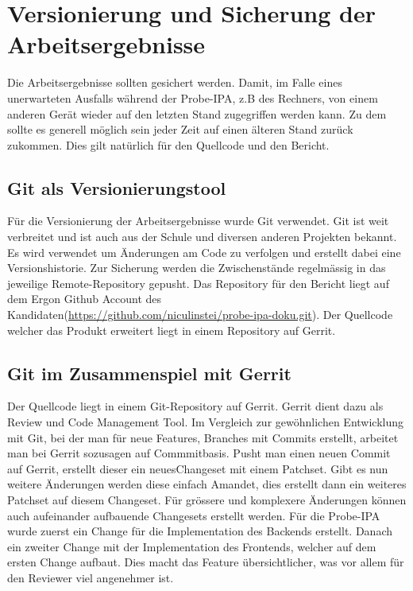 \chapter{Versionierung und Sicherung der Arbeitsergebnisse}\label{ch:versionierung-und-sicherung-der-arbeitsergebnisse}

Die Arbeitsergebnisse sollten gesichert werden. Damit, im Falle eines unerwarteten Ausfalls während der Probe-IPA, z.B des Rechners, von einem anderen Gerät wieder auf den letzten Stand zugegriffen werden kann. Zu dem sollte es generell möglich sein jeder Zeit auf einen älteren Stand zurück zukommen. Dies gilt natürlich für den Quellcode und den Bericht.

\section{Git als Versionierungstool}
Für die Versionierung der Arbeitsergebnisse wurde Git verwendet. 
Git ist weit verbreitet und ist auch aus der Schule und diversen anderen Projekten bekannt. Es wird verwendet um Änderungen am Code zu verfolgen und erstellt dabei eine Versionshistorie. \newline Zur Sicherung werden die Zwischenstände regelmässig in das jeweilige Remote-Repository gepusht.
Das Repository für den Bericht liegt auf dem Ergon Github Account des Kandidaten(\url{https://github.com/niculinstei/probe-ipa-doku.git}).
Der Quellcode welcher das Produkt erweitert liegt in einem Repository auf Gerrit.



\section{Git im Zusammenspiel mit Gerrit}
Der Quellcode liegt in einem Git-Repository auf Gerrit. Gerrit dient dazu als Review und Code Management Tool. 
Im Vergleich zur \flqq gewöhnlichen\frqq{}  Entwicklung mit Git, bei der man für neue Features, Branches mit Commits erstellt, arbeitet man bei Gerrit sozusagen auf Commmitbasis. 
Pusht man einen neuen Commit auf Gerrit, erstellt dieser ein neues\flqq Changeset\frqq{}  mit einem Patchset. Gibt es nun weitere Änderungen werden diese einfach Amandet, dies erstellt dann ein weiteres Patchset auf diesem Changeset. Für grössere und komplexere Änderungen können auch aufeinander aufbauende Changesets erstellt werden. Für die Probe-IPA wurde zuerst ein Change für die Implementation des Backends erstellt. Danach ein zweiter Change mit der Implementation des Frontends, welcher auf dem ersten Change aufbaut. Dies macht das Feature übersichtlicher, was vor allem für den Reviewer viel angenehmer ist.

